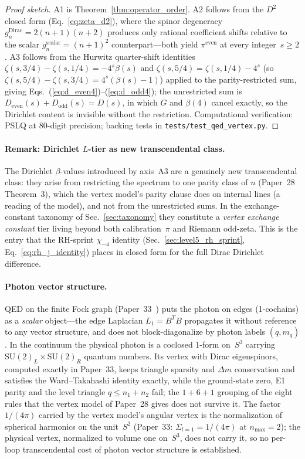 \documentclass[aps,pra,twocolumn,superscriptaddress,longbibliography]{revtex4-2}
\begin{document}
\begin{proof}[Proof sketch]
A1 is Theorem~\ref{thm:operator_order}.  A2 follows from the
$D^2$ closed form (Eq.~\ref{eq:zeta_d2}), where the spinor degeneracy
$g_n^{\mathrm{Dirac}} = 2(n+1)(n+2)$ produces only rational
coefficient shifts relative to the scalar $g_n^{\mathrm{scalar}} =
(n+1)^2$ counterpart---both yield $\pi^{\mathrm{even}}$ at every
integer~$s \ge 2$.  A3 follows from the Hurwitz quarter-shift
identities $\zeta(s, 3/4) - \zeta(s, 1/4) = -4^s \beta(s)$ and
$\zeta(s, 5/4) = \zeta(s, 1/4) - 4^s$ (so
$\zeta(s, 5/4) - \zeta(s, 3/4) = 4^s(\beta(s) - 1)$) applied
to the parity-restricted sum, giving
Eqs.~(\ref{eq:d_even4})--(\ref{eq:d_odd4}); the unrestricted sum is
$D_{\mathrm{even}}(s) + D_{\mathrm{odd}}(s) = D(s)$, in which $G$
and $\beta(4)$ cancel exactly, so the Dirichlet content is invisible
without the restriction.  Computational verification: PSLQ at
80-digit precision; backing tests in
\texttt{tests/test\_qed\_vertex.py}.
\end{proof}

\paragraph{Remark: Dirichlet $L$-tier as new transcendental class.}
The Dirichlet $\beta$-values introduced by axis~A3 are a genuinely
new transcendental class: they arise from restricting the spectrum
to one parity class of $n$ (Paper~28 Theorem~3), which the vertex
model's parity clause does on internal lines (a reading of the model),
and not from the unrestricted sums.  In the exchange-constant taxonomy of
Sec.~\ref{sec:taxonomy} they constitute a \emph{vertex exchange
constant} tier living beyond both calibration~$\pi$ and Riemann
odd-zeta.  This is the entry that the RH-sprint $\chi_{-4}$ identity
(Sec.~\ref{sec:level5_rh_sprint}, Eq.~\ref{eq:rh_j_identity}) places
in closed form for the full Dirac Dirichlet difference.

\paragraph{Photon vector structure.}
QED on the finite Fock graph (Paper~33~\cite{loutey_paper33}) puts the
photon on edges (1-cochains) as a \emph{scalar} object---the edge
Laplacian $L_1 = B^T\!B$ propagates it without reference to any vector
structure, and does not block-diagonalize by photon labels
$(q, m_q)$.  In the continuum the physical photon is a coclosed 1-form
on~$S^3$ carrying $\mathrm{SU}(2)_L \times \mathrm{SU}(2)_R$ quantum
numbers.  Its vertex with Dirac eigenspinors, computed exactly in
Paper~33, keeps triangle sparsity and $\Delta m$ conservation and
satisfies the Ward--Takahashi identity exactly, while the ground-state
zero, E1 parity and the level triangle $q \le n_1 + n_2$ fail; the
$1{+}6{+}1$ grouping of the eight rules that the vertex model of
Paper~28 gives does not survive it.  The factor $1/(4\pi)$ carried by
the vertex model's angular vertex is the normalization of spherical
harmonics on the unit~$S^2$ (Paper~33: $\Sigma_{l=1} = 1/(4\pi)$ at
$n_{\max} = 2$); the physical vertex, normalized to volume one
on~$S^3$, does not carry it, so no per-loop transcendental cost of
photon vector structure is established.
\end{document}
